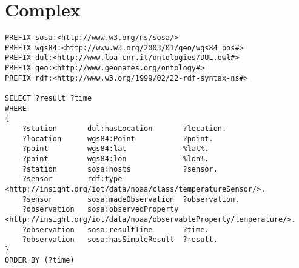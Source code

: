 \section{Complex}

\begin{lstlisting}[captionpos=b, 
language=sparql,
title=Query 1. List all the temperature values from a given location and order by time,
basicstyle=\ttfamily,frame=single]
PREFIX sosa:<http://www.w3.org/ns/sosa/>
PREFIX wgs84:<http://www.w3.org/2003/01/geo/wgs84_pos#>
PREFIX dul:<http://www.loa-cnr.it/ontologies/DUL.owl#>
PREFIX geo:<http://www.geonames.org/ontology#>
PREFIX rdf:<http://www.w3.org/1999/02/22-rdf-syntax-ns#>

SELECT ?result ?time
WHERE
{
    ?station       dul:hasLocation       ?location.
    ?location      wgs84:Point           ?point.
    ?point         wgs84:lat             %lat%.
    ?point         wgs84:lon             %lon%.
    ?station       sosa:hosts            ?sensor.
    ?sensor        rdf:type              <http://insight.org/iot/data/noaa/class/temperatureSensor/>.
    ?sensor        sosa:madeObservation  ?observation.
    ?observation   sosa:observedProperty <http://insight.org/iot/data/noaa/observableProperty/temperature/>.
    ?observation   sosa:resultTime       ?time.
    ?observation   sosa:hasSimpleResult  ?result.
}
ORDER BY (?time)
\end{lstlisting}

